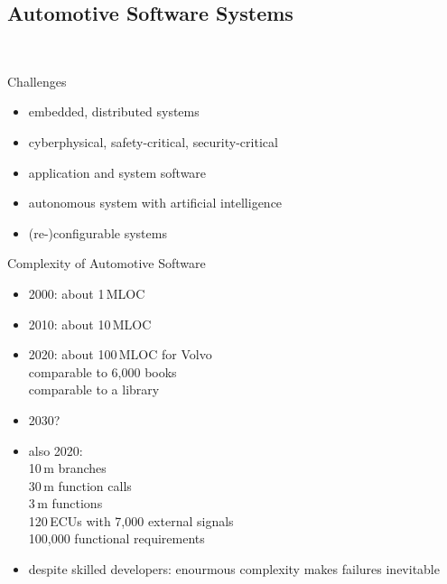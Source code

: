 \subsection{Automotive Software Systems}
\begin{frame}{\insertsubsection\ \mytitlesource{\broy}}
	\begin{fancycolumns}
		\begin{definition}{Challenges\mysource{\staron}}
			\begin{itemize}
				\item embedded, distributed systems
				\item cyberphysical, safety-critical, security-critical
				\item application and system software
				\item autonomous system with artificial intelligence
				\item (re-)configurable systems
			\end{itemize}
		\end{definition}
		\nextcolumn
		\begin{definition}{Complexity of Automotive Software\mysource{\antinyan}}
			\begin{itemize}
				\item 2000: about 1\,MLOC
				\item 2010: about 10\,MLOC
				\item 2020: about 100\,MLOC for Volvo\\comparable to 6,000 books\\comparable to a library
				\item 2030?
				\item also 2020:\\10\,m branches\\30\,m function calls\\3\,m functions\\120\,ECUs with 7,000 external signals\\100,000 functional requirements
				\item despite skilled developers: enourmous complexity makes failures inevitable
			\end{itemize}
		\end{definition}
	\end{fancycolumns}
\end{frame}

